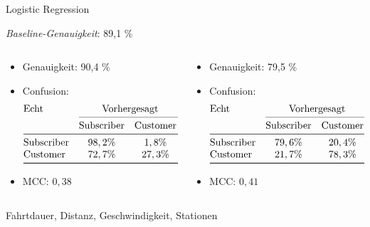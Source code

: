 \begin{frame}{Logistic Regression}

\emph{Baseline-Genauigkeit}: 89,1 \%

\begin{columns}
\begin{column}{0.5\textwidth}
{
\begin{itemize}
\item Genauigkeit: 90,4 \%
\item Confusion:
\[
\begin{array}{@{}l*{5}{c}@{}}
\text{Echt} & \multicolumn{2}{c@{}}{\text{Vorhergesagt}}\\
    \cmidrule(l){2-3}
    & \text{Subscriber} & \text{Customer}\\
\midrule
\text{Subscriber} & 98,2\% & 1,8 \% \\
\text{Customer}   & 72,7 \% & 27,3 \% \\
\bottomrule
\end{array}
\]
\item MCC: $0,38$
\end{itemize}
}
\end{column}
\begin{column}{0.5\textwidth}
{
\begin{itemize}
\item Genauigkeit: 79,5 \%
\item Confusion:
\[
\begin{array}{@{}l*{5}{c}@{}}
\text{Echt} & \multicolumn{2}{c@{}}{\text{Vorhergesagt}}\\
    \cmidrule(l){2-3}
    & \text{Subscriber} & \text{Customer}\\
\midrule
\text{Subscriber} & 79,6\% & 20,4 \% \\
\text{Customer}   & 21,7 \% & 78,3 \% \\
\bottomrule
\end{array}
\]
\item MCC: $0,41$
\end{itemize}
}
\end{column}
\end{columns}

{
Fahrtdauer, Distanz, Geschwindigkeit, Stationen
}
\end{frame}


